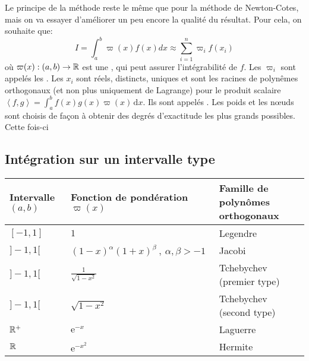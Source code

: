 Le principe de la méthode reste le même que pour la méthode de Newton-Cotes, mais
on va essayer d'améliorer un peu encore la qualité du résultat.
Pour cela, on souhaite que:
\begin{equation}I=\int_a^b \varpi(x)f(x)dx \approx \sum_{i=1}^n \varpi_if(x_i)\end{equation}
où $\varpi(x): (a,b)\rightarrow\mathbb R$ est une , 
qui peut assurer l'intégrabilité de $f$. 
Les $\varpi_i$ sont appelés les .
Les $x_i$ sont réels, distincts, uniques et sont les racines de polynêmes orthogonaux 
(et non plus uniquement de Lagrange) pour le produit scalaire 
$\left\langle f,g \right\rangle = \int_a^b f(x)g(x) \varpi(x) \,\mathrm{d}x$. 
Ils sont appelés  .
Les poids et les nœuds sont choisis de façon à obtenir des degrés d'exactitude les plus 
grands possibles.
Cette fois-ci 

\medskip
\subsection*{Intégration sur un intervalle type}


\begin{center}
\begin{tabular}{lll}
Intervalle $(a,b)$ & Fonction de pondération $\varpi(x)$ & Famille de polynômes orthogonaux\\
\hline
$[-1,1]$ & $1$ & Legendre\\
$]-1,1[$ & $(1-x)^\alpha (1+x)^\beta \ , \ \alpha, \beta > -1$ & Jacobi\\
$]-1,1[$ & $\frac{1}{\sqrt{1-x^2}}$ &Tchebychev (premier type)\\
$]-1,1[$ & $\sqrt{1-x^2}$ & Tchebychev (second type)\\
$\mathbb R^+$ & $\mathrm{e}^{-x}$ & Laguerre\\
$\mathbb R$ & $\mathrm{e}^{-x^2}$ & Hermite\\
\end{tabular}
\end{center}

